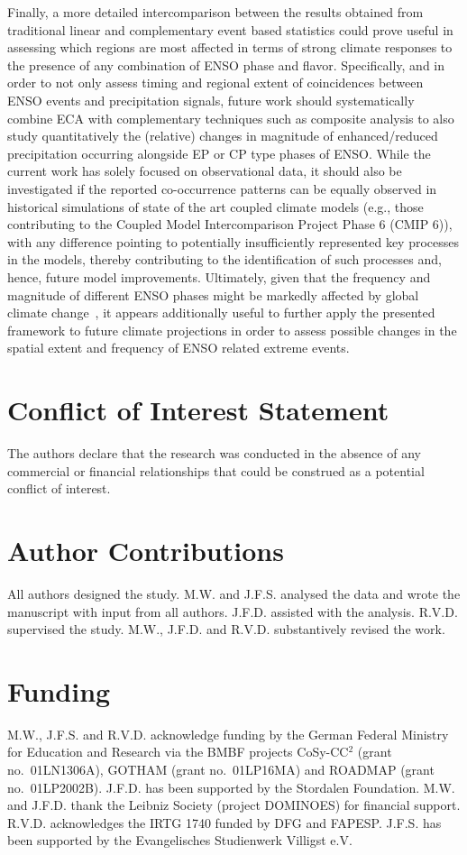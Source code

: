 \documentclass[utf8]{frontiersSCNS} %
\begin{document}
Finally, a more detailed intercomparison between the results obtained from traditional linear and complementary event based statistics could prove useful in assessing which regions are most affected in terms of strong climate responses to the presence of any combination of ENSO phase and flavor. Specifically, and in order to not only assess timing and regional extent of coincidences between ENSO events and precipitation signals, future work should systematically combine ECA with complementary techniques such as composite analysis to also study quantitatively the (relative) changes in magnitude of enhanced/reduced precipitation occurring alongside EP or CP type phases of ENSO. While the current work has solely focused on observational data, it should also be investigated if the reported co-occurrence patterns can be equally observed in historical simulations of state of the art coupled climate models (e.g., those contributing to the Coupled Model Intercomparison Project Phase 6 (CMIP 6)), with any difference pointing to potentially insufficiently represented key processes in the models, thereby contributing to the identification of such processes and, hence, future model improvements. Ultimately, given that the frequency and magnitude of different ENSO phases might be markedly affected by global climate change~\citep{yeh2007enso, stevenson2012significant, cai_increasing_2014, cai2015increased}, it appears additionally useful to further apply the presented framework to future climate projections in order to assess possible changes in the spatial extent and frequency of ENSO related extreme events.

\section*{Conflict of Interest Statement}
The authors declare that the research was conducted in the absence of any commercial or financial relationships that could be construed as a potential conflict of interest.

\section*{Author Contributions}
All authors designed the study. M.W. and J.F.S. analysed the data and wrote the manuscript with input from all authors. J.F.D. assisted with the analysis. R.V.D. supervised the study. M.W., J.F.D. and R.V.D. substantively revised the work.

\section*{Funding}
M.W., J.F.S. and R.V.D. acknowledge funding by the German Federal Ministry for Education and Research via the BMBF projects CoSy-CC$^2$ (grant no.~01LN1306A), GOTHAM (grant no.~01LP16MA) and ROADMAP (grant no.~01LP2002B). J.F.D. has been supported by the Stordalen Foundation. M.W. and J.F.D. thank the Leibniz Society (project DOMINOES) for financial support. R.V.D. acknowledges the IRTG 1740 funded by DFG and FAPESP. J.F.S. has been supported by the Evangelisches Studienwerk Villigst e.V. 
\end{document}
